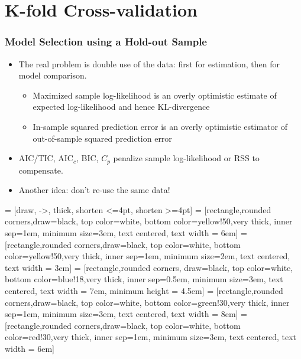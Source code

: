\section{K-fold Cross-validation}
\begin{frame}
  \frametitle{Model Selection using a Hold-out Sample}

  \begin{itemize}
    \item The real problem is \alert{double} use of the data: first for estimation, then for model comparison. 
      \begin{itemize}
        \item Maximized sample log-likelihood is an overly optimistic estimate of expected log-likelihood and hence KL-divergence 
        \item In-sample squared prediction error is an overly optimistic estimator of out-of-sample squared prediction error 
      \end{itemize}
  \item AIC/TIC, AIC$_c$, BIC, $C_p$ \alert{penalize} sample log-likelihood or RSS to compensate. 
  \item Another idea: \alert{don't re-use the same data!}
  \end{itemize}

\end{frame}
 = [draw, ->,  thick, shorten <=4pt, shorten >=4pt]
 = [rectangle,rounded corners,draw=black, top color=white, bottom color=yellow!50,very thick, inner sep=1em, minimum size=3em, text centered, text width = 6em]
 = [rectangle,rounded corners,draw=black, top color=white, bottom color=yellow!50,very thick, inner sep=1em, minimum size=2em, text centered, text width = 3em]
 = [rectangle,rounded corners, draw=black, top color=white, bottom color=blue!18,very thick, inner sep=0.5em, minimum size=3em, text centered, text width = 7em, minimum height = 4.5em]
 = [rectangle,rounded corners,draw=black, top color=white, bottom color=green!30,very thick, inner sep=1em, minimum size=3em, text centered, text width = 8em]
 = [rectangle,rounded corners,draw=black, top color=white, bottom color=red!30,very thick, inner sep=1em, minimum size=3em, text centered, text width = 6em]

